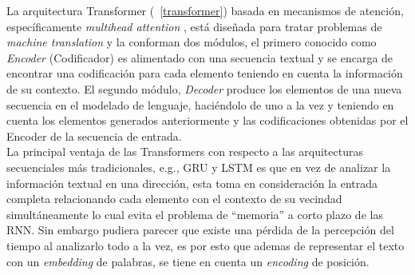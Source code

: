 	La arquitectura Transformer (\figurename~\ref{transformer}) basada en mecanismos de atención, específicamente \textit{multihead attention} \citep{vaswani2017attention}, está diseñada para tratar problemas de \textit{machine translation} y la conforman dos módulos, el primero conocido como \textit{Encoder} (Codificador) es alimentado con una secuencia textual y se encarga de encontrar una codificación para cada elemento teniendo en cuenta la información de su contexto. El segundo módulo, \textit{Decoder} produce los elementos de una nueva secuencia en el modelado de lenguaje, haciéndolo de uno a la vez y teniendo en cuenta los elementos generados anteriormente y las codificaciones obtenidas por el Encoder de la secuencia de entrada.
	\\
	La principal ventaja de las Transformers con respecto a las arquitecturas secuenciales más tradicionales, e.g., GRU y LSTM es que en vez de analizar la información textual en una dirección, esta toma en consideración la entrada completa relacionando cada elemento con el contexto de su vecindad simultáneamente lo cual evita el problema de ``memoria'' a corto plazo de las RNN.  Sin embargo pudiera parecer que existe una pérdida de la percepción del tiempo al analizarlo todo a la vez, es por esto que ademas de representar el texto con un \textit{embedding} de palabras, se tiene en cuenta un \textit{encoding} de posición. 
	
